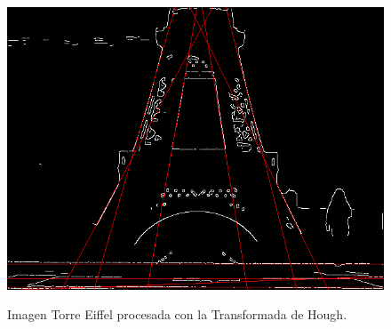 \begin{figure}[ht!]
\begin{center}
\includegraphics[height=0.4\textwidth]{fig/eiffel_hough}\\
\caption{Imagen Torre Eiffel procesada con la Transformada de Hough.}
\label{fig_eiffel_hough}
\end{center}
\end{figure}

